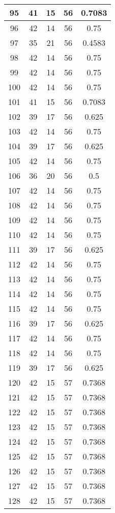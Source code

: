 \documentclass[letterpaper, 12pt]{article}
\begin{document}
\begin{longtable}{|c|c|c|c|c|}
\hline
95 & 41 & 15 & 56 & 0.7083 \\
\hline
96 & 42 & 14 & 56 & 0.75 \\
\hline
97 & 35 & 21 & 56 & 0.4583 \\
\hline
98 & 42 & 14 & 56 & 0.75 \\
\hline
99 & 42 & 14 & 56 & 0.75 \\
\hline
100 & 42 & 14 & 56 & 0.75 \\
\hline
101 & 41 & 15 & 56 & 0.7083 \\
\hline
102 & 39 & 17 & 56 & 0.625 \\
\hline
103 & 42 & 14 & 56 & 0.75 \\
\hline
104 & 39 & 17 & 56 & 0.625 \\
\hline
105 & 42 & 14 & 56 & 0.75 \\
\hline
106 & 36 & 20 & 56 & 0.5 \\
\hline
107 & 42 & 14 & 56 & 0.75 \\
\hline
108 & 42 & 14 & 56 & 0.75 \\
\hline
109 & 42 & 14 & 56 & 0.75 \\
\hline
110 & 42 & 14 & 56 & 0.75 \\
\hline
111 & 39 & 17 & 56 & 0.625 \\
\hline
112 & 42 & 14 & 56 & 0.75 \\
\hline
113 & 42 & 14 & 56 & 0.75 \\
\hline
114 & 42 & 14 & 56 & 0.75 \\
\hline
115 & 42 & 14 & 56 & 0.75 \\
\hline
116 & 39 & 17 & 56 & 0.625 \\
\hline
117 & 42 & 14 & 56 & 0.75 \\
\hline
118 & 42 & 14 & 56 & 0.75 \\
\hline
119 & 39 & 17 & 56 & 0.625 \\
\hline
120 & 42 & 15 & 57 & 0.7368 \\
\hline
121 & 42 & 15 & 57 & 0.7368 \\
\hline
122 & 42 & 15 & 57 & 0.7368 \\
\hline
123 & 42 & 15 & 57 & 0.7368 \\
\hline
124 & 42 & 15 & 57 & 0.7368 \\
\hline
125 & 42 & 15 & 57 & 0.7368 \\
\hline
126 & 42 & 15 & 57 & 0.7368 \\
\hline
127 & 42 & 15 & 57 & 0.7368 \\
\hline
128 & 42 & 15 & 57 & 0.7368 \\

\end{longtable}
\end{document}
